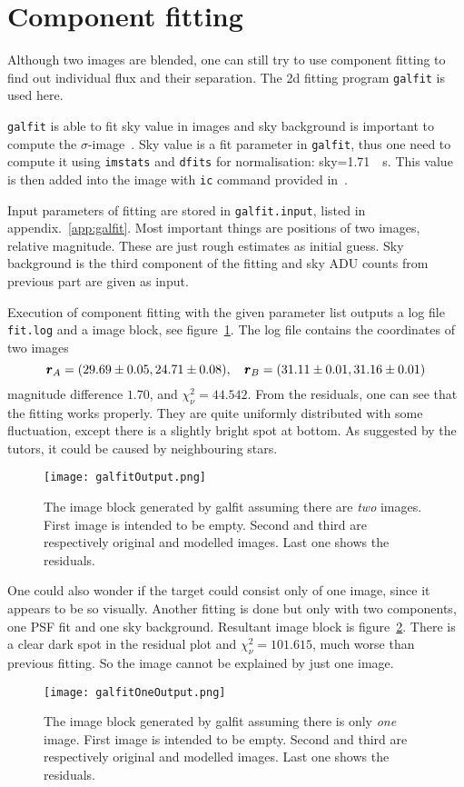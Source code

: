 \clearpage
\section{Component fitting}
Although two images are blended, one can still try to use component fitting to find out individual flux and their separation. The 2d fitting program \verb|galfit| is used here.

\verb|galfit| is able to fit sky value in images and sky background is important to compute the $\sigma$-image~\cite{galfitManual}. Sky value is a fit parameter in \verb|galfit|, thus one need to compute it using \verb|imstats| and \verb|dfits| for normalisation: sky=\SI{1.71}{\per\s}. This value is then added into the image with \verb|ic| command provided in~\cite{manual}.

Input parameters of fitting are stored in \verb|galfit.input|, listed in appendix.~\ref{app:galfit}. Most important things are positions of two images, relative magnitude. These are just rough estimates as initial guess. Sky background is the third component of the fitting and sky ADU counts from previous part are given as input.

Execution of component fitting with the given parameter list outputs a log file \verb|fit.log| and a image block, see figure~\ref{fig:galfitOut}. The log file contains the coordinates of two images
\begin{equation*}
	\pmb{r}_A = (\num{29.69 +- 0.05}, \num{24.71 +- 0.08}),\quad \pmb{r}_B = (\num{31.11 +- 0.01}, \num{31.16 +- 0.01})
\end{equation*}
magnitude difference $1.70$, and $\chi^2_\nu = \num{44.542}$. From the residuals, one can see that the fitting works properly. They are quite uniformly distributed with some fluctuation, except there is a slightly bright spot at bottom. As suggested by the tutors, it could be caused by neighbouring stars. 
\begin{figure}[ht]
	\centering
	\texttt{[image: galfitOutput.png]}
	\caption{The image block generated by galfit assuming there are \textit{two} images. First image is intended to be empty. Second and third are respectively original and modelled images. Last one shows the residuals.}%
	\label{fig:galfitOut}
\end{figure}

One could also wonder if the target could consist only of one image, since it appears to be so visually. Another fitting is done but only with two components, one PSF fit and one sky background. Resultant image block is figure~\ref{fig:galfitOneOut}. There is a clear dark spot in the residual plot and $\chi^2_\nu = 101.615$, much worse than previous fitting. So the image cannot be explained by just one image.
\begin{figure}[ht]
	\centering
	\texttt{[image: galfitOneOutput.png]}
	\caption{The image block generated by galfit assuming there is only \textit{one} image. First image is intended to be empty. Second and third are respectively original and modelled images. Last one shows the residuals.}%
	\label{fig:galfitOneOut}
\end{figure}

